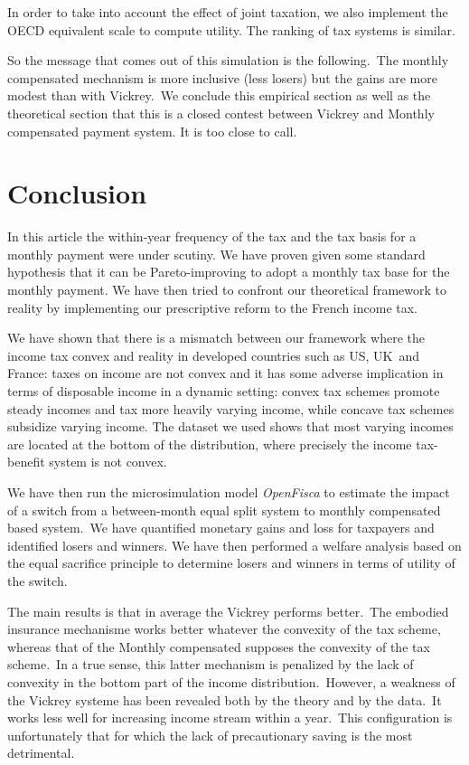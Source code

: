 In order to take into account the effect of joint taxation, we also implement
the OECD equivalent scale to compute utility. The ranking of tax systems is similar.\ 

So the message that comes out of this simulation is the following.\ The
monthly compensated mechanism is more inclusive (less losers) but the gains
are more modest than with Vickrey.\ We conclude this empirical section as well
as the theoretical section that this is a closed contest between Vickrey and
Monthly compensated payment system. It is too close to call.\ \medskip

\section{Conclusion}

In this article the within-year frequency of the tax and the tax basis for a
monthly payment were under scutiny. We have proven given some standard
hypothesis that it can be Pareto-improving to adopt a monthly tax base for the
monthly payment. We have then tried to confront our theoretical framework to
reality by implementing our prescriptive reform to the French income tax.

We have shown that there is a mismatch between our framework where the income
tax convex and reality in developed countries such as US, UK\ and France:
taxes on income are not convex and it has some adverse implication in terms of
disposable income in a dynamic setting: convex tax schemes promote steady
incomes and tax more heavily varying income, while concave tax schemes
subsidize varying income. The dataset we used shows that most varying incomes
are located at the bottom of the distribution, where precisely the income
tax-benefit system is not convex.

We have then run the microsimulation model \emph{OpenFisca} to estimate the
impact of a switch from a between-month equal split system to monthly
compensated based system.\ We have quantified monetary gains and loss for
taxpayers and identified losers and winners. We have then performed a welfare
analysis based on the equal sacrifice principle to determine losers and
winners in terms of utility of the switch.

The main results is that in average the Vickrey performs better.\ The embodied
insurance mechanisme works better whatever the convexity of the tax scheme,
whereas that of the Monthly compensated supposes the convexity of the tax
scheme.\ In a true sense, this latter mechanism is penalized by the lack of
convexity in the bottom part of the income distribution.\ However, a weakness
of the Vickrey systeme has been revealed both by the theory and by the
data.\ It works less well for increasing income stream within a year.\ This
configuration is unfortunately that for which the lack of precautionary saving
is the most detrimental.\ 

